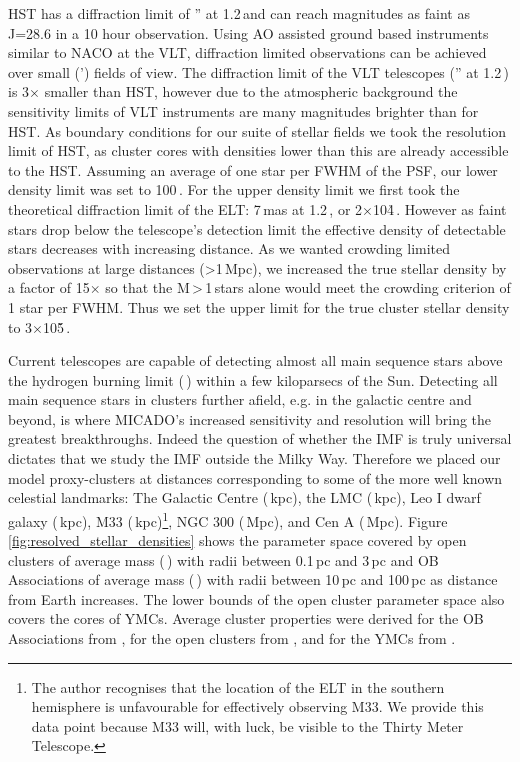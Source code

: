 HST has a diffraction limit of '' at 1.2\,\um and can reach magnitudes as faint as J=28.6\m \citep{hst_wfc3} in a 10 hour observation. Using AO assisted ground based instruments similar to NACO at the VLT, diffraction limited observations can be achieved over small (') fields of view. 
The diffraction limit of the VLT telescopes ('' at 1.2\,\um) is 3$\times$ smaller than HST, however due to the atmospheric background the sensitivity limits of VLT instruments are many magnitudes brighter than for HST. 
As boundary conditions for our suite of stellar fields we took the resolution limit of HST, as cluster cores with densities lower than this are already accessible to the HST. 
Assuming an average of one star per FWHM of the PSF, our lower density limit was set to 100\,\spa. 
For the upper density limit we first took the theoretical diffraction limit of the ELT: 7\,mas at 1.2\,\ume, or 2$\times$10\h4\,\spae. However as faint stars drop below the telescope's detection limit the effective density of detectable stars decreases with increasing distance. 
As we wanted crowding limited observations at large distances (\textgreater1\,Mpc), we increased the true stellar density by a factor of 15$\times$ so that the M\,\textgreater\,1\,\msun stars alone would meet the crowding criterion of 1 star per FWHM. 
Thus we set the upper limit for the true cluster stellar density to 3$\times$10\h5\,\spa.

Current telescopes are capable of detecting almost all main sequence stars above the hydrogen burning limit (\,\msune) within a few kiloparsecs of the Sun\needcite. 
Detecting all main sequence stars in clusters further afield, e.g. in the galactic centre and beyond, is where MICADO's increased sensitivity and resolution will bring the greatest breakthroughs. 
Indeed the question of whether the IMF is truly universal dictates that we study the IMF outside the Milky Way. 
Therefore we placed our model proxy-clusters at distances corresponding to some of the more well known celestial landmarks: The Galactic Centre (\,kpc), the LMC (\,kpc), Leo I dwarf galaxy (\,kpc), M33 (\,kpc)\footnote{The author recognises that the location of the ELT in the southern hemisphere is unfavourable for effectively observing M33. We provide this data point because M33 will, with luck, be visible to the Thirty Meter Telescope.}, NGC 300 (\,Mpc), and Cen A (\,Mpc). 
Figure \ref{fig:resolved_stellar_densities} shows the parameter space covered by open clusters of average mass (\,\msun) with radii between 0.1\,pc and 3\,pc and OB Associations of average mass (\,\msun) with radii between 10\,pc and 100\,pc as distance from Earth increases. 
The lower bounds of the open cluster parameter space also covers the cores of YMCs. Average cluster properties were derived for the OB Associations from \citet{melnik1995}, for the open clusters from \citet{piskunov2007}, and for the YMCs from \citet{portegies2010}.



